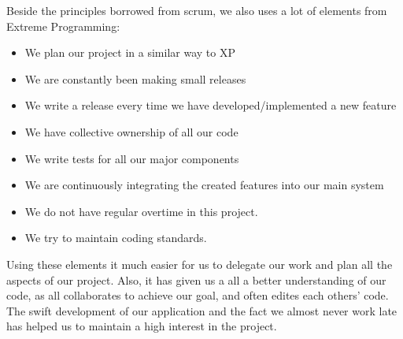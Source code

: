 Beside the principles borrowed from scrum, we also uses a lot of elements from Extreme Programming:
\begin{itemize}
\item We plan our project in a similar way to XP
\item We are constantly been making small releases 
\item We write a release every time we have developed/implemented a new feature
\item We have collective ownership of all our code
\item We write tests for all our major components 
\item We are continuously integrating the created features into our main system
\item We do not have regular overtime in this project.
\item We try to maintain coding standards.
\end{itemize}
Using these elements it much easier for us to delegate our work and plan all the aspects of our project. Also, it has given us a all a better understanding of our code, as all collaborates to achieve our goal, and often edites each others' code. The swift development of our application and the fact we almost never work late has helped us to maintain a high interest in the project.